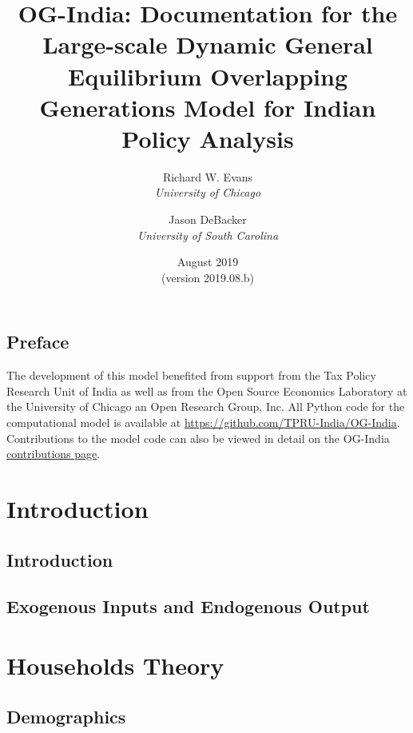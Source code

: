 \documentclass[letterpaper,12pt]{book}
\theoremstyle{definition}
\numberwithin{equation}{chapter}
\begin{document}
\frontmatter

\title{OG-India: Documentation for the Large-scale Dynamic General Equilibrium Overlapping Generations Model for Indian Policy Analysis}
\author{Richard W. Evans\\ \emph{University of Chicago} \and Jason DeBacker \\ \emph{University of South Carolina}}
\date{\LARGE{August 2019} \\
{\footnotesize{(version 2019.08.b)}}}
\maketitle

\chapter{Preface}

  The development of this model benefited from support from the Tax Policy Research Unit of India as well as from the Open Source Economics Laboratory at the University of Chicago an Open Research Group, Inc. All Python code for the computational model is available at \href{https://github.com/TPRU-India/OG-India}{https://github.com/TPRU-India/OG-India}. Contributions to the model code can also be viewed in detail on the OG-India \href{https://github.com/TPRU-India/OG-India/graphs/contributors}{contributions page}.

\setcounter{tocdepth}{1}
\tableofcontents


\mainmatter

\part{Introduction}
  \chapter{Introduction}\label{Chap_Intro}
    
  \chapter{Exogenous Inputs and Endogenous Output}\label{Chap_ExogEndog}
    

\part{Households Theory}\label{PartHHtheory}
  \chapter{Demographics}\label{Chap_Demog}
    
\end{document}
